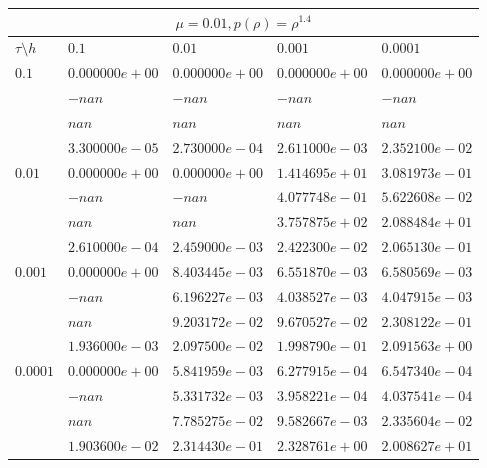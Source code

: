 \documentclass[12pt,a4paper]{article}
\begin{document}
\begin{tabular}{ |l|l|l|l|l| }
    \hline
    \multicolumn{5}{|c|}{$\mu = 0.01, p(\rho)  = \rho^{1.4}$} \\
    \hline
    $\tau\setminus h$ & $0.1$ & $0.01$ & $0.001$ & $0.0001$\\
    \hline
    $0.1$ & $0.000000e+00$ & $0.000000e+00$ & $0.000000e+00$ & $0.000000e+00$ \\
    & $-nan$ & $-nan$ & $-nan$ & $-nan$ \\
    & $nan$ & $nan$ & $nan$ & $nan$ \\
    & $3.300000e-05$ & $2.730000e-04$ & $2.611000e-03$ & $2.352100e-02$ \\
    \hline
    $0.01$ & $0.000000e+00$ & $0.000000e+00$ & $1.414695e+01$ & $3.081973e-01$ \\
    & $-nan$ & $-nan$ & $4.077748e-01$ & $5.622608e-02$ \\
    & $nan$ & $nan$ & $3.757875e+02$ & $2.088484e+01$ \\
    & $2.610000e-04$ & $2.459000e-03$ & $2.422300e-02$ & $2.065130e-01$ \\
    \hline
    $0.001$ & $0.000000e+00$ & $8.403445e-03$ & $6.551870e-03$ & $6.580569e-03$ \\
    & $-nan$ & $6.196227e-03$ & $4.038527e-03$ & $4.047915e-03$ \\
    & $nan$ & $9.203172e-02$ & $9.670527e-02$ & $2.308122e-01$ \\
    & $1.936000e-03$ & $2.097500e-02$ & $1.998790e-01$ & $2.091563e+00$ \\
    \hline
    $0.0001$ & $0.000000e+00$ & $5.841959e-03$ & $6.277915e-04$ & $6.547340e-04$ \\
    & $-nan$ & $5.331732e-03$ & $3.958221e-04$ & $4.037541e-04$ \\
    & $nan$ & $7.785275e-02$ & $9.582667e-03$ & $2.335604e-02$ \\
    & $1.903600e-02$ & $2.314430e-01$ & $2.328761e+00$ & $2.008627e+01$ \\
    \hline
\end{tabular}
\end{document}
